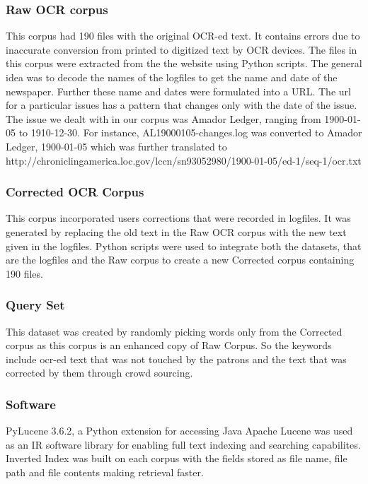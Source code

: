 \subsubsection{Raw OCR corpus}
This corpus had 190 files with the original OCR-ed text. It contains errors due to inaccurate conversion from printed to digitized text by OCR devices. The files in this corpus were extracted from the the website \cite{datasource} using Python scripts. The general idea was to decode the names of the logfiles to get the name and date of the newspaper. Further these name and dates were formulated into a URL. The url for a particular issues has a pattern that changes only with the date of the issue. The issue we dealt with in our corpus was Amador Ledger, ranging from 1900-01-05 to 1910-12-30.  For instance, AL19000105-changes.log was converted to Amador Ledger, 1900-01-05 which was further translated to http://chroniclingamerica.loc.gov/lccn/sn93052980/1900-01-05/ed-1/seq-1/ocr.txt\\

\subsubsection{Corrected OCR Corpus}
This corpus incorporated users corrections that were recorded in logfiles. It was generated by replacing the old text in the Raw OCR corpus with the new text given in the logfiles. Python scripts were used to integrate both the datasets, that are the logfiles and the Raw corpus to create a new Corrected corpus containing 190 files.\\

\subsubsection{Query Set}
This dataset was created by randomly picking words only from the Corrected corpus as this corpus is an enhanced copy of Raw Corpus. So the keywords include ocr-ed text that was not touched by the patrons and the text that was corrected by them through crowd sourcing. \\

\subsubsection {Software}
PyLucene 3.6.2, a Python extension for accessing Java Apache Lucene was used as an IR software library for enabling full text indexing and searching capabilites. Inverted Index was built on each corpus with the fields stored as file name, file path and file contents making retrieval faster.

